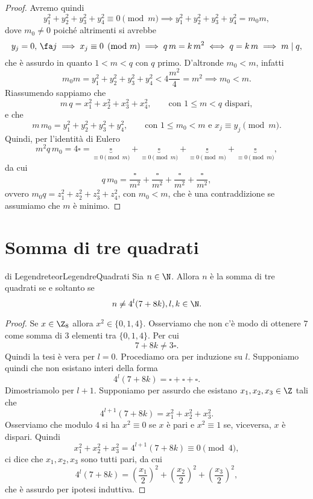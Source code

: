 \begin{proof}
	Avremo quindi
	\[
		y_1^2+y_2^2+y_3^2+y_4^2 \equiv 0 \pmod{m} \implies y_1^2+y_2^2+y_3^2+y_4^2 = m_0 m,
	\]
	dove \(m_0\neq 0\) poiché altrimenti si avrebbe
	\[
		y_j = 0,\,\fa j \implies x_j \equiv 0 \pmod{m} \implies q\,m = k\,m^2 \iff q = k\,m \implies m\mid q,
	\]
	che è assurdo in quanto \(1<m<q\) con \(q\) primo.
	D'altronde \(m_0<m\), infatti
	\[
		m_0 m = y_1^2+y_2^2+y_3^2+y_4^2 < 4 \frac{m^2}{4} = m^2 \implies m_0<m.
	\]
	Riassumendo sappiamo che
	\[
		m\,q = x_1^2+x_2^2+x_3^2+x_4^2, \qquad\text{con \(1\le m<q\) dispari},
	\]
	e che
	\[
		m\,m_0 = y_1^2+y_2^2+y_3^2+y_4^2, \qquad\text{con \(1\le m_0<m\) e \(x_j\equiv y_j \pmod{m}\)}.
	\]
	Quindi, per l'identità di Eulero
	\[
		m^2q\,m_0 = 4\square = \underbrace{\square}_{\equiv 0 \pmod{m}} + \underbrace{\square}_{\equiv 0 \pmod{m}} + \underbrace{\square}_{\equiv 0 \pmod{m}} + \underbrace{\square}_{\equiv 0 \pmod{m}},
	\]
	da cui
	\[
		q\,m_0 = \frac{\square}{m^2}+\frac{\square}{m^2}+\frac{\square}{m^2}+\frac{\square}{m^2},
	\]
	ovvero \(m_0 q =z_1^2+z_2^2+z_3^2+z_4^2\), con \(m_0<m\), che è una contraddizione se assumiamo che \(m\) è minimo.
\end{proof}
\section{Somma di tre quadrati}

\begin{teor}{di Legendre}{teorLegendreQuadrati}
	Sia \(n\in\N\).
	Allora \(n\) è la somma di tre quadrati se e soltanto se
	\[
		n \neq 4^l (7+8k),l,k\in\N.
	\]
\end{teor}

\begin{proof}
	\graffito{\(\Rightarrow)\)}Se \(x\in\Z_8\) allora \(x^2\in\{0,1,4\}\).
	Osserviamo che non c'è modo di ottenere \(7\) come somma di \(3\) elementi tra \(\{0,1,4\}\).
	Per cui
	\[
		7+8k \neq 3\square.
	\]
	Quindi la tesi è vera per \(l=0\).
	Procediamo ora per induzione su \(l\).
	Supponiamo quindi che non esistano interi della forma
	\[
		4^l(7+8k) = \square + \square + \square.
	\]
	Dimostriamolo per \(l+1\).
	Supponiamo per assurdo che esistano \(x_1,x_2,x_3\in\Z\) tali che
	\[
		4^{l+1}(7+8k) = x_1^2+x_2^2+x_3^2.
	\]
	Osserviamo che modulo \(4\) si ha \(x^2 \equiv 0\) se \(x\) è pari e \(x^2\equiv 1\) se, viceversa, \(x\) è dispari.
	Quindi
	\[
		x_1^2+x_2^2+x_3^2 = 4^{l+1}(7+8k) \equiv 0 \pmod{4},
	\]
	ci dice che \(x_1,x_2,x_3\) sono tutti pari, da cui
	\[
		4^l(7+8k) = \left( \frac{x_1}{2} \right)^2 + \left( \frac{x_2}{2} \right)^2 + \left( \frac{x_3}{2} \right)^2,
	\]
	che è assurdo per ipotesi induttiva.
\end{proof}